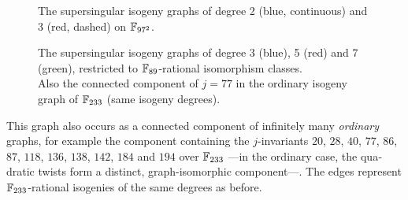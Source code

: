 \begin{otherlanguage}{english}
\begin{figure}
\begin{minipage}{0.47\textwidth}
      \caption{The supersingular isogeny graphs of degree 2
        (blue, continuous) and 3 (red, dashed) on $\mathbb{F}_{97^2}$.}
      \label{fig:sidh}
    \end{minipage}
    \hfill
    \begin{minipage}{0.47\textwidth}
      \centering
      \caption{The supersingular isogeny graphs of degree 3 (blue), 5
        (red) and 7 (green), restricted to $\mathbb{F}_{89}$-rational
        isomorphism classes.\\
        Also the connected component of $j=77$ in the ordinary isogeny
        graph of $\mathbb{F}_{233}$ (same isogeny degrees).}
      \label{fig:csidh}
    \end{minipage}
  \end{figure}

  This graph also occurs as a connected component of infinitely many
  \emph{ordinary} graphs, for example the component containing the
  $j$-invariants $20$, $28$, $40$, $77$, $86$, $87$, $118$, $136$,
  $138$, $142$, $184$ and $194$ over $\mathbb{F}_{233}$ ---in the ordinary
  case, the quadratic twists form a distinct, graph-isomorphic
  component---. The edges represent $\mathbb{F}_{233}$-rational isogenies of
  the same degrees as before.


\end{otherlanguage}

